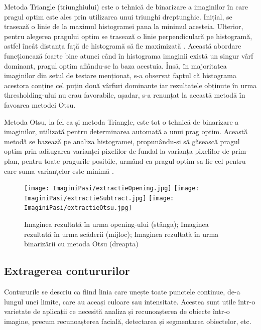 \documentclass[12pt]{article}
\begin{document}
Metoda Triangle (triunghiului) este o tehnic\u{a} de binarizare a imaginilor \^{i}n care pragul optim este ales prin utilizarea unui triunghi dreptunghic. Inițial, se traseaz\u{a} o linie de la maximul histogramei pana la minimul acesteia. Ulterior, pentru alegerea pragului optim se traseaz\u{a} o linie perpendicular\u{a} pe histogram\u{a}, astfel \^{i}nc\^{a}t distanța faț\u{a} de histogram\u{a} s\u{a} fie maximizat\u{a} \cite{segmentation}. Aceast\u{a} abordare funcționeaz\u{a} foarte bine atunci c\^{a}nd \^{i}n histograma imaginii exist\u{a} un singur v\^{a}rf dominant, pragul optim afl\^{a}ndu-se la baza acestuia. \^{I}ns\u{a}, \^{i}n majoritatea imaginilor din setul de testare menționat, s-a observat faptul c\u{a} histograma acestora conține cel puțin dou\u{a} v\^{a}rfuri dominante iar rezultatele obținute \^{i}n urma thresholding-ului nu erau favorabile, așadar, s-a renunțat la aceast\u{a} metod\u{a} \^{i}n favoarea metodei Otsu.

Metoda Otsu, la fel ca și metoda Triangle, este tot o tehnic\u{a} de binarizare a imaginilor, utilizat\u{a} pentru determinarea automat\u{a} a unui prag optim. Aceast\u{a} metod\u{a} se bazeaz\u{a} pe analiza histogramei, propun\^{a}ndu-și s\u{a} g\u{a}seasc\u{a} pragul optim prin ad\u{a}ugarea varianței pixelilor de fundal la varianța pixelilor de prim-plan, pentru toate pragurile posibile, urm\^{a}nd ca pragul optim sa fie cel pentru care suma varianțelor este minim\u{a} \cite{otsu}.

\begin{figure}[H]
  \centering
  \texttt{[image: ImaginiPasi/extractieOpening.jpg]}\hfill
  \texttt{[image: ImaginiPasi/extractieSubtract.jpg]}\hfill
    \texttt{[image: ImaginiPasi/extractieOtsu.jpg]}
  \caption{Imaginea rezultat\u{a} \^{i}n urma opening-ului (st\^{a}nga); Imaginea rezultat\u{a} \^{i}n urma sc\u{a}derii (mijloc); Imaginea rezultat\u{a} \^{i}n urma binariz\u{a}rii cu metoda Otsu (dreapta)}
  \label{fig:substract_threshold}
\end{figure}

\subsection{Extragerea contururilor}

Contururile se descriu ca fiind linia care unește toate punctele continue, de-a lungul unei limite, care au aceași culoare sau intensitate. Acestea sunt utile \^{i}ntr-o varietate de aplicații ce necesit\u{a} analiza și recunoașterea de obiecte \^{i}ntr-o imagine, precum recunoașterea facial\u{a}, detectarea și segmentarea obiectelor, etc.
\end{document}
